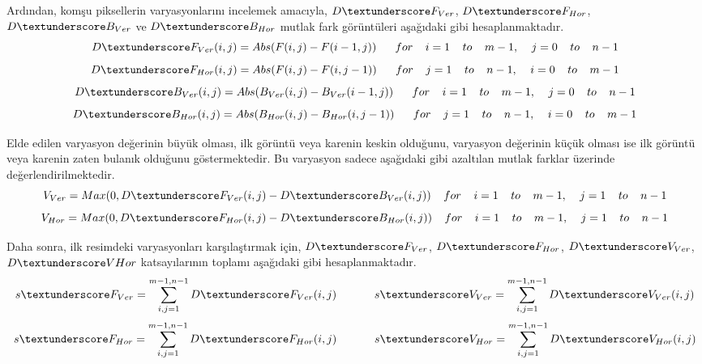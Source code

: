 	Ardından, komşu piksellerin varyasyonlarını incelemek amacıyla, $D\textunderscore F_{Ver}$, $D\textunderscore F_{Hor}$, $D\textunderscore B_{Ver}$ ve $D\textunderscore B_{Hor}$ mutlak fark görüntüleri aşağıdaki gibi hesaplanmaktadır.
	\begin{equation}
	    D\textunderscore F_{Ver}(i,j)=Abs(F(i,j)-F(i-1,j))\;\;\;\;\;\;for\;\;\;\;i=1\;\;\;\;to\;\;\;\;m-1,\;\;\;\;j=0\;\;\;\;to\;\;\;\;n-1
	\end{equation}
	\begin{equation}
	    D\textunderscore F_{Hor}(i,j)=Abs(F(i,j)-F(i,j-1)) \;\;\;\;\;\;for\;\;\;\;j=1\;\;\;\;to\;\;\;\;n-1,\;\;\;\;i=0\;\;\;\;to\;\;\;\; m-1
	\end{equation}
	\begin{equation}
	    D\textunderscore B_{Ver}(i,j)=Abs(B_{Ver}(i,j)-B_{Ver}(i-1,j)) \;\;\;\;\;\;for\;\;\;\;i=1\;\;\;\;to\;\;\;\;m-1,\;\;\;\;j=0\;\;\;\;to\;\;\;\; n-1
	\end{equation}
	\begin{equation}
	    D\textunderscore B_{Hor}(i,j)=Abs(B_{Hor}(i,j)-B_{Hor}(i,j-1)) \;\;\;\;\;\;for\;\;\;\;j=1\;\;\;\;to\;\;\;\;n-1,\;\;\;\;i=0\;\;\;\;to\;\;\;\; m-1
	\end{equation}
	
	Elde edilen varyasyon değerinin büyük olması, ilk görüntü veya karenin keskin olduğunu, varyasyon değerinin küçük olması ise ilk görüntü veya karenin zaten bulanık olduğunu göstermektedir. Bu varyasyon sadece aşağıdaki gibi azaltılan mutlak farklar üzerinde değerlendirilmektedir.
	\begin{equation}
	    V_{Ver}= Max(0,D\textunderscore F_{Ver}(i,j)-D\textunderscore B_{Ver}(i,j)) \;\;\;\;for\;\;\;\;i=1\;\;\;\;to\;\;\;\;m-1,\;\;\;\;j=1\;\;\;\;to\;\;\;\;n-1
	\end{equation}
	\begin{equation}
	    V_{Hor}= Max(0,D\textunderscore F_{Hor}(i,j)-D\textunderscore B_{Hor}(i,j))\;\;\;\;for\;\;\;\;i=1\;\;\;\;to\;\;\;\;m-1, \;\;\;\;j=1\;\;\;\;to\;\;\;\;n-1
	\end{equation}
	
	Daha sonra, ilk resimdeki varyasyonları karşılaştırmak için, $D\textunderscore F_{Ver}$, $D\textunderscore F_{Hor}$, $D\textunderscore V_{Ver}$, $D\textunderscore V{Hor}$ katsayılarının toplamı aşağıdaki gibi hesaplanmaktadır.
	\begin{equation}
	    s\textunderscore F_{Ver}=\sum_{i,j=1}^{m-1,n-1} D\textunderscore F_{Ver}(i,j) \;\;\;\;\;\;\;\;\;\;\;\; s\textunderscore V_{Ver}=\sum_{i,j=1}^{m-1,n-1} D\textunderscore V_{Ver}(i,j)
	\end{equation}
		\begin{equation}
	    s\textunderscore F_{Hor}=\sum_{i,j=1}^{m-1,n-1} D\textunderscore F_{Hor}(i,j) \;\;\;\;\;\;\;\;\;\;\;\; s\textunderscore V_{Hor}=\sum_{i,j=1}^{m-1,n-1} D\textunderscore V_{Hor}(i,j)
	\end{equation}
	
